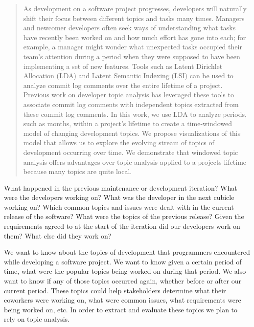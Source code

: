 \documentclass[times, 10pt,twocolumn]{article}
\begin{document}
\begin{abstract}

  As development on a software project progresses, developers will
  naturally shift their focus between different topics and tasks many
  times.  Managers and newcomer developers often seek ways of
  understanding what tasks have recently been worked on and how much
  effort has gone into each; for example, a manager might wonder what
  unexpected tasks occupied their team's attention during a period
  when they were supposed to have been implementing a set of new
  features.  Tools such as Latent Dirichlet Allocation (LDA) and
  Latent Semantic Indexing (LSI) can be used to analyze commit log
  comments over the entire lifetime of a project. Previous work on
  developer topic analysis has leveraged these tools to associate
  commit log comments with independent topics extracted from these
  commit log comments.  In this work, we use LDA  to analyze
  periods, such as months, within a project's lifetime to create a
  time-windowed model of changing development topics.  We propose 
  visualizations of this model that allows us to explore the evolving
  stream of topics of development occurring over time.  We demonstrate
  that windowed topic analysis offers advantages over topic analysis
  applied to a projects lifetime because many topics are quite local.



\end{abstract}


What happened in the previous maintenance or development iteration?
What were the developers working on? What was the developer in the
next cubicle working on? Which common topics and issues were dealt
with in the current release of the software? What were the topics of
the previous release? Given the requirements agreed to at the start
of the iteration did our developers work on them?  What else did they
work on?


We want to know about the topics of development that programmers
encountered while developing a software project. We want to know given
a certain period of time, what were the popular topics being worked on
during that period. We also want to know if any of those topics
occurred again, whether before or after our current period.  These
topics could help stakeholders determine what their coworkers were
working on, what were common issues, what requirements were being
worked on, etc. In order to extract and evaluate these topics we plan
to rely on topic analysis.
\end{document}
